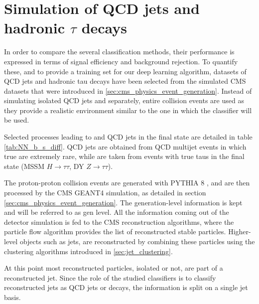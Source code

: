 \section{Simulation of QCD jets and hadronic $\tau$ decays}
\label{sec:NN_datasets}

In order to compare the several classification methods, their performance is expressed in terms of signal efficiency and background rejection. To quantify these, and to provide a training set for our deep learning algorithm, datasets of QCD jets and hadronic tau decays have been selected from the simulated CMS datasets that were introduced in \ref{sec:cms_physics_event_generation}. Instead of simulating isolated QCD jets and \tauh separately, entire collision events are used as they provide a realistic environment similar to the one in which the classifier will be used.

Selected processes leading to \tauh and QCD jets in the final state are detailed in table \ref{tab:NN_b_s_diff}. QCD jets are obtained from QCD multijet events in which true \tauh are extremely rare, while \tauh are taken from events with true taus in the final state (MSSM $H\rightarrow \tau\tau$, DY $Z\rightarrow \tau\tau$).


The proton-proton collision events are generated with PYTHIA 8 \cite{SJOSTRAND2008852}, and are then processed by the CMS GEANT4 simulation, as detailed in section \ref{sec:cms_physics_event_generation}. The generation-level information is kept and will be referred to as gen level. All the information coming out of the detector simulation is fed to the CMS reconstruction algorithms, where the particle flow algorithm provides the list of reconstructed stable particles. Higher-level objects such as jets, are reconstructed by combining these particles using the clustering algorithms introduced in \ref{sec:jet_clustering}.

At this point most reconstructed particles, isolated or not, are part of a reconstructed jet. Since the role of the studied classifiers is to classify reconstructed jets as QCD jets or \tauh decays, the information is split on a single jet basis.

